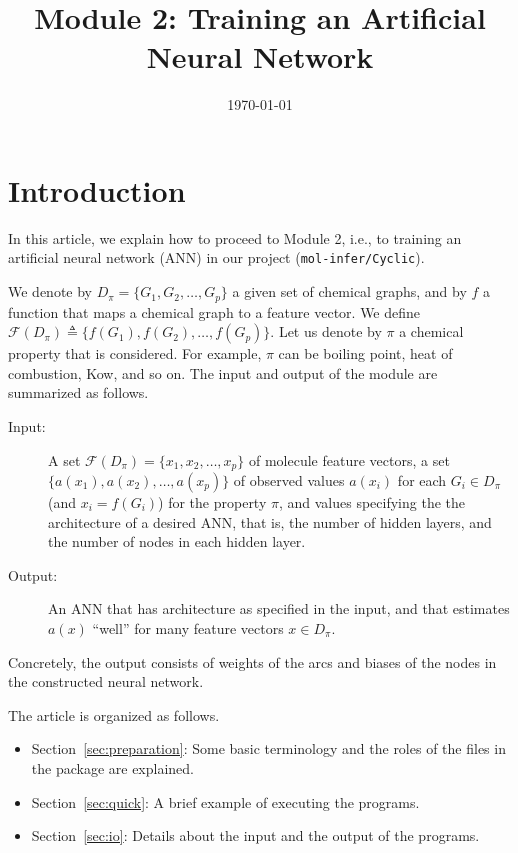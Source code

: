\documentclass[11pt, titlepage, dvipdfmx, twoside]{article}
\title{\huge Module 2:
Training an Artificial Neural Network}
\author{\project}
\newcommand{\project}{{\tt mol-infer/Cyclic}}
\newcommand{\secref}[1]{Section~\ref{sec:#1}}
\begin{document}
\makeatletter 
\let\c@lstlisting\c@figure
\makeatother
\date{\today}
\maketitle
\thispagestyle{empty}
\tableofcontents
\clearpage
{}


\section{Introduction}
In this article,
we explain how to proceed to  Module 2, 
i.e., to training an artificial neural network (ANN)
in our project (\project).

We denote by $D_\pi=\{G_1,G_2,\dots,G_p\}$ a given set of chemical graphs,
and by $f$ a function that maps a chemical graph to a feature vector.
We define ${\mathcal F}(D_\pi)\triangleq\{f(G_1),f(G_2),\dots,f(G_p)\}$. 
Let us denote by $\pi$ a chemical property that is considered.
For example, $\pi$ can be boiling point, heat of combustion, Kow, and so on. 
The input and output of the module are summarized as follows.

\begin{oframed}
\begin{description}
\item[Input:] 
A set ${\mathcal F}(D_\pi)=\{x_1, x_2,\dots, x_p\}$ of molecule feature vectors,
  a set $\{a(x_1), a(x_2), \dots, a(x_p)\}$ of observed values $a(x_i)$ for 
  each $G_i\in D_\pi$ (and $x_i=f(G_i)$)
  for the property $\pi$,
  and values specifying the the architecture of a desired  ANN,
  that is, the number of hidden layers, 
  and the number of nodes in each hidden layer. 
\item[Output:] 
An ANN that
  has architecture as specified in the input,
  and that estimates $a(x)$ ``well'' for many feature vectors $x \in D_\pi$. 
\end{description}
\end{oframed}
%
Concretely, the output consists of weights of the arcs
and biases of the nodes in the constructed neural network. 

The article is organized as follows. 
\begin{itemize}
\item \secref{preparation}: 
Some basic terminology and the roles of the files in the package are explained. 
%
\item \secref{quick}: 
A brief example of executing the programs. 
%
\item \secref{io}: Details about the input and the output of the programs. 
\end{itemize}
\end{document}
